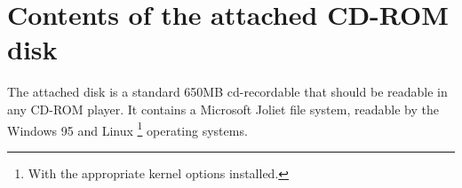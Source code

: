 
\chapter{Contents of the attached CD-ROM disk}
\label{appendix:cdrom}

The attached disk is a standard 650MB cd-recordable that should be
readable in any CD-ROM player.  It contains a Microsoft Joliet file
system, readable by the Windows 95 and Linux%
\footnote{With the appropriate kernel options installed.}
operating systems.

